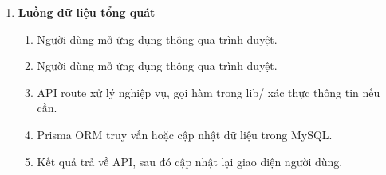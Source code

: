 \documentclass[a4paper]{article}
\begin{document}
\begin{enumerate}[label=\textbf{\alph*.}]
          \begin{itemize}
              \item Frontend (UI):
                    \begin{itemize}
                        \item Next.js + React: Hiển thị giao diện người dùng.
                        \item Components: Các phần tử UI trong components/.
                        \item Tailwind CSS/ CSS Modules: Thiết kế giao diện hiện đại, tiện tùy biến.
                    \end{itemize}
              \item Backend (API):
                    \begin{itemize}
                        \item API Routes/ Server Actions: Các route xử lý backend được viết trong pages/api/ hoặc app/api/ (tùy App Router).
                        \item Lib hàm xử lý logic: Dùng để chia nhỏ các nghiệp vụ phức tạp.
                    \end{itemize}
              \item ORM và CSDL:
                    \begin{itemize}
                        \item Prisma ORM: Cầu nối giữa backend và CSDL, giúp viết truy vấn dễ hiểu, bảo mật và dễ bảo trì.
                        \item MySQL (XAMPP): Lưu trữ dữ liệu người dùng, sản phẩm, loại sản phẩm, ...
                    \end{itemize}
          \end{itemize}
    \item \textbf{Luồng dữ liệu tổng quát}
          \begin{enumerate}[label=B\arabic*.]
              \item Người dùng mở ứng dụng thông qua trình duyệt.
              \item Người dùng mở ứng dụng thông qua trình duyệt.
              \item API route xử lý nghiệp vụ, gọi hàm trong lib/ xác thực thông tin nếu cần.
              \item Prisma ORM truy vấn hoặc cập nhật dữ liệu trong MySQL.
              \item Kết quả trả về API, sau đó cập nhật lại giao diện người dùng.
          \end{enumerate}
\end{enumerate}
\end{document}
